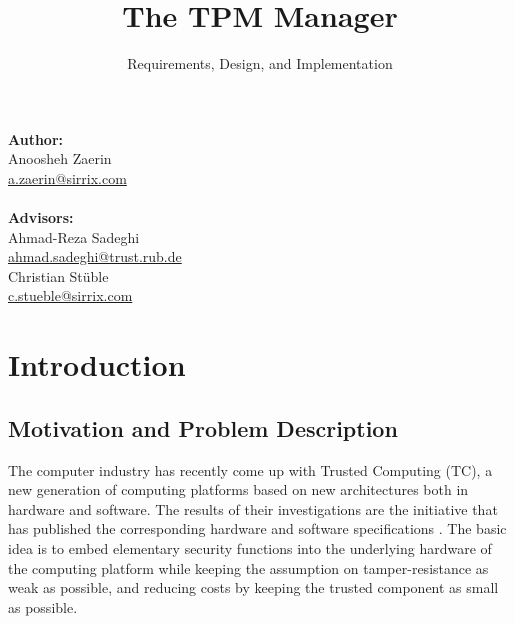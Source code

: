 \documentclass[
  american        %
]{sirrixreport}
\title{The TPM Manager}
\subtitle{Requirements, Design, and Implementation}
\begin{document}
\maketitle		%
\cleardoublepage        %

\begin{table}
{\large \textbf{Author:}}\\

Anoosheh Zaerin\\
\url{a.zaerin@sirrix.com} \\
\\
{\large \textbf{Advisors:}} \\

              Ahmad-Reza Sadeghi \\
             \url{ahmad.sadeghi@trust.rub.de} \\

 Christian St\"uble \\
             \url{c.stueble@sirrix.com}

\end{table}



\tableofcontents	%
\listoffigures

\lstset{language=C++,
        basicstyle=\small,
   commentstyle=\itshape,
   identifierstyle=\ttfamily,
   keywordstyle=\ttfamily,
   stringstyle=\ttfamily
}


\chapter{Introduction}
\label{chap:usingclassfile}

\section{Motivation and Problem Description}
\label{sec:motivation}

The computer industry has recently come up with Trusted Computing (TC), a new generation of computing platforms based on new architectures both in hardware and software. The results of their investigations are the \TCG initiative that has published the corresponding hardware and software specifications \cite{TPM_1.2.103}.
The basic idea is to embed elementary security functions into the underlying hardware of the computing platform while keeping the assumption on tamper-resistance as weak as possible, and reducing costs by keeping the trusted component as small as possible.
\end{document}

